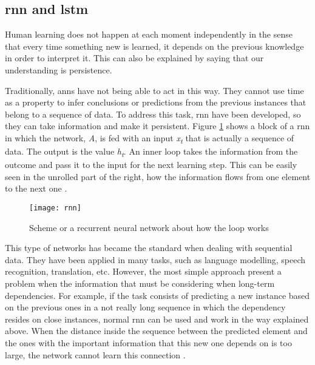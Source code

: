 
\subsection{\acrlong{rnn} and \acrlong{lstm}}
\label{subsection:rnn-lstm}

	Human learning does not happen at each moment independently in the sense that every time something new is learned, it depends on the previous knowledge in order to interpret it. This can also be explained by saying that our understanding is persistence.
	
	Traditionally, \acrlong{ann}s have not being able to act in this way. They cannot use time as a property to infer conclusions or predictions from the previous instances that belong to a sequence of data. To address this task, \acrfull{rnn} have been developed, so they can take information and make it persistent. Figure \ref{fig:mesh39} shows a block of a \acrshort{rnn} in which the network, \textit{A}, is fed with an input \textit{x\textsubscript{t}} that is actually a sequence of data. The output is the value \textit{h\textsubscript{t}}. An inner loop takes the information from the outcome and pass it to the input for the next learning step. This can be easily seen in the unrolled part of the right, how the information flows from one element to the next one \cite{Olah2015}. 
	
	\begin{figure}[h]
		\centering
		\captionsetup{justification=centering}
		\texttt{[image: rnn]}
		\caption{Scheme or a recurrent neural network about how the loop works }
		\label{fig:mesh39}
	\end{figure}

	This type of networks has became the standard when dealing with sequential data. They have been applied in many tasks, such as language modelling, speech recognition, translation, etc. However, the most simple approach present a problem when the information that must be considering when long-term dependencies. For example, if the task consists of predicting a new instance based on the previous ones in a not really long sequence in which the dependency resides on close instances, normal \acrshort{rnn} can be used and work in the way explained above. When the distance inside the sequence between the predicted element and the ones with the important information that this new one depends on is too large, the network cannot learn this connection \cite{Olah2015}. 
	

